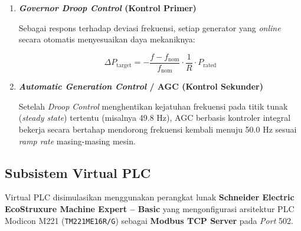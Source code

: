\begin{enumerate}
\item[d.] \textbf{\textit{Governor Droop Control} (Kontrol Primer)}

Sebagai respons terhadap deviasi frekuensi, setiap generator yang \textit{online} secara otomatis menyesuaikan daya mekaniknya:

\begin{equation}
    \Delta P_{\mathrm{target}} =
    -\frac{f - f_{\mathrm{nom}}}{f_{\mathrm{nom}}}
    \cdot \frac{1}{R} \cdot P_{\mathrm{rated}}
    \label{eq:droop}
\end{equation}

\item[e.] \textbf{\textit{Automatic Generation Control} / AGC (Kontrol Sekunder)}

Setelah \textit{Droop Control} menghentikan kejatuhan frekuensi pada titik tunak (\textit{steady state}) tertentu (misalnya 49.8 Hz), AGC berbasis kontroler integral bekerja secara bertahap mendorong frekuensi kembali menuju 50.0 Hz sesuai \textit{ramp rate} masing-masing mesin.
\end{enumerate}

\subsection{Subsistem Virtual PLC}
\label{subsec:Virtual_PLC}

Virtual PLC disimulasikan menggunakan perangkat lunak \textbf{Schneider Electric EcoStruxure Machine Expert -- Basic} yang mengonfigurasi arsitektur PLC Modicon M221 (\texttt{TM221ME16R/G}) sebagai \textbf{Modbus TCP Server} pada \textit{Port} 502.

